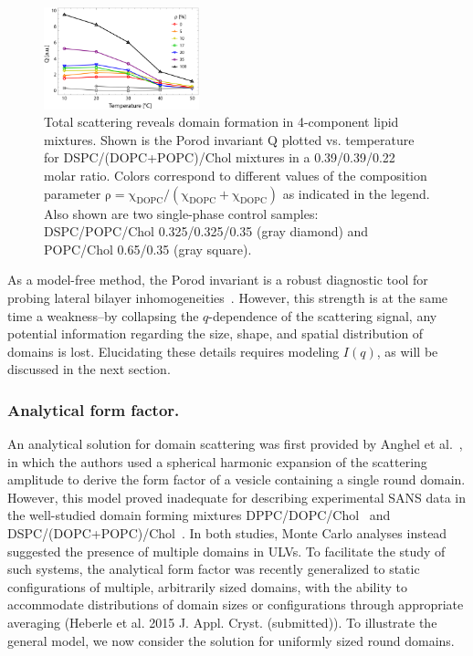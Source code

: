 \documentclass[8.5pt,twoside,twocolumn]{article}
\begin{document}
\begin{figure} [t]
	\centering
	\includegraphics[width=0.4\textwidth]{figures/figure_3_porod.eps}
	\caption{Total scattering reveals domain formation in 4-component lipid mixtures. Shown is the Porod invariant Q plotted vs. temperature for DSPC/(DOPC+POPC)/Chol mixtures in a 0.39/0.39/0.22 molar ratio. Colors correspond to different values of the composition parameter $\mathrm{\rho=\chi_{DOPC}/(\chi_{DOPC}+\chi_{DOPC})}$ as indicated in the legend. Also shown are two single-phase control samples: DSPC/POPC/Chol 0.325/0.325/0.35 (gray diamond) and POPC/Chol 0.65/0.35 (gray square).}
	\label{fig:porod}
	
\end{figure}

As a model-free method, the Porod invariant is a robust diagnostic tool for probing lateral bilayer inhomogeneities~\cite{Heberle.2013,RobinS.Petruzielo.2013}. However, this strength is at the same time a weakness--by collapsing the $q$-dependence of the scattering signal, any potential information regarding the size, shape, and spatial distribution of domains is lost. Elucidating these details requires modeling $I(q)$, as will be discussed in the next section.

\subsubsection{Analytical form factor. }
An analytical solution for domain scattering was first provided by Anghel et al.~\cite{Anghel.2007}, in which the authors used a spherical harmonic expansion of the scattering amplitude to derive the form factor of a vesicle containing a single round domain. However, this model proved inadequate for describing experimental SANS data in the well-studied domain forming mixtures DPPC/DOPC/Chol~\cite{Pencer.2005} and DSPC/(DOPC+POPC)/Chol~\cite{Heberle.2013}. In both studies, Monte Carlo analyses instead suggested the presence of multiple domains in ULVs. To facilitate the study of such systems, the analytical form factor was recently generalized to static configurations of multiple, arbitrarily sized domains, with the ability to accommodate distributions of domain sizes or configurations through appropriate averaging (Heberle et al. 2015 J. Appl. Cryst. (submitted)). To illustrate the general model, we now consider the solution for uniformly sized round domains.
\end{document}

